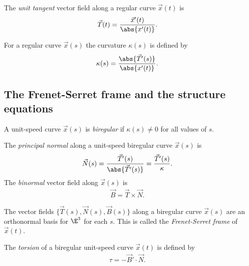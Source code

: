 \documentclass{article}
\begin{document}
\begin{definition}
	The \emph{unit tangent} vector field along a regular curve $\vec x(t)$ is
	\begin{align*}
		\vec T(t) = \frac{\vec x'(t)}{\abs{x'(t)}}.
	\end{align*}
\end{definition}

\begin{definition}
	For a regular curve $\vec x(s)$ the curvature $\kappa(s)$ is defined by
	\begin{align*}
		\kappa(s) = \frac{\abs{\vec T'(s)}}{\abs{x'(t)}}.
	\end{align*}
\end{definition}

\subsection{The Frenet-Serret frame and the structure equations}

\begin{definition}
	A unit-speed curve $\vec x(s)$ is \emph{biregular} if $\kappa(s)\not=0$ for
	all values of $s$.
\end{definition}

\begin{definition}
	The \emph{principal normal} along a unit-speed biregular curve $\vec x(s)$ is
	\begin{align*}
		\vec N(s) = \frac{\vec T'(s)}{\abs{\vec T'(s)}}=\frac{\vec T'(s)}{\kappa}.
	\end{align*}
	The \emph{binormal} vector field along $\vec x(s)$ is
	\begin{align*}
		\vec B = \vec T \times \vec N.
	\end{align*}
\end{definition}

\begin{proposition}[Notes 3.14]
	The vector fields $\{\vec T(s), \vec N(s), \vec B(s)\}$ along a biregular curve
	$\vec x(s)$ are an orthonormal basis for $\E^3$ for each $s$. This is called the
	\emph{Frenet-Serret frame} of $\vec x(t)$.
\end{proposition}

\begin{definition}
	The \emph{torsion} of a biregular unit-speed curve $\vec x(t)$ is defined by
	\begin{align*}
		\tau = - \vec B' \cdot \vec N.
	\end{align*}
\end{definition}
\end{document}
